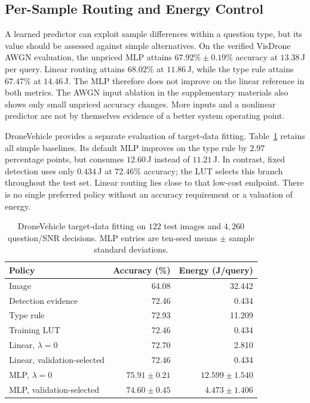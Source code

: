 \subsection{Per-Sample Routing and Energy Control}
\label{subsec:persample-exp}\label{subsec:energyctl}
A learned predictor can exploit sample differences within a question
type, but its value should be assessed against simple alternatives.
On the verified VisDrone AWGN evaluation, the unpriced MLP attains
$67.92\%\pm0.19\%$ accuracy at $13.38$\,J per query. Linear routing
attains $68.02\%$ at $11.86$\,J, while the type rule attains
$67.47\%$ at $14.46$\,J. The MLP therefore does not improve on
the linear reference in both metrics. The AWGN input ablation in
the supplementary materials also shows only small unpriced
accuracy changes. More inputs and a nonlinear predictor are not
by themselves evidence of a better system operating point.

DroneVehicle provides a separate evaluation of target-data fitting.
Table~\ref{tab:dv} retains all simple baselines. Its default MLP
improves on the type rule by $2.97$ percentage points, but consumes
$12.60$\,J instead of $11.21$\,J. In contrast, fixed detection
uses only $0.434$\,J at $72.46\%$ accuracy; the LUT selects this
branch throughout the test set. Linear routing lies close to that
low-cost endpoint. There is no single preferred policy without
an accuracy requirement or a valuation of energy.

\begin{table}[t]\centering
\caption{DroneVehicle target-data fitting on $122$ test images and
$4{,}260$ question/SNR decisions. MLP entries are ten-seed
means $\pm$ sample standard deviations.}\label{tab:dv}
\footnotesize
\begin{tabular}{@{}lrr@{}}\toprule
Policy & Accuracy (\%) & Energy (J/query)\\\midrule
Image & 64.08 & 32.442\\
Detection evidence & 72.46 & 0.434\\
Type rule & 72.93 & 11.209\\
Training LUT & 72.46 & 0.434\\
Linear, $\lambda=0$ & 72.70 & 2.810\\
Linear, validation-selected & 72.46 & 0.434\\
MLP, $\lambda=0$ & $75.91\pm0.21$ & $12.599\pm1.540$\\
MLP, validation-selected & $74.60\pm0.45$ & $4.473\pm1.406$\\
\bottomrule\end{tabular}
\end{table}

